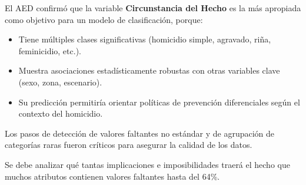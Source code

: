 \documentclass[lettersize,journal]{IEEEtran}
\begin{document}
El AED confirmó que la variable \textbf{Circunstancia del Hecho} es la más apropiada como objetivo para un modelo de clasificación, porque:

\begin{itemize}
    \item Tiene múltiples clases significativas (homicidio simple, agravado, riña, feminicidio, etc.).
    \item Muestra asociaciones estadísticamente robustas con otras variables clave (sexo, zona, escenario).
    \item Su predicción permitiría orientar políticas de prevención diferenciales según el contexto del homicidio.
\end{itemize}

Los pasos de detección de valores faltantes no estándar y de agrupación de categorías raras fueron críticos para asegurar la calidad de los datos. 

Se debe analizar qué tantas implicaciones e imposibilidades traerá el hecho que muchos atributos contienen valores faltantes hasta del 64\%.
\end{document}
